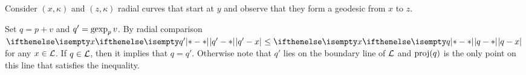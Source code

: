

Consider $(x,\kappa)$ and $(z,\kappa)$ radial curves that start at $y$
and observe that they form a geodesic from $x$ to $z$.

 Set $q=p+v$ and $q'=\mathop{\rm gexp}\nolimits_pv$. 
By radial comparison $\dist{q'}{x}{}\le \dist{q}{x}{}$ for any $x\in \spc{L}$.
If $q\in \spc{L}$, then it implies that $q=q'$.
Otherwise note that $q'$ lies on the boundary line of $\mathcal{L}$ and $\mathop{\rm proj}\nolimits(q)$ is the only point on this line that satisfies the inequality. 

